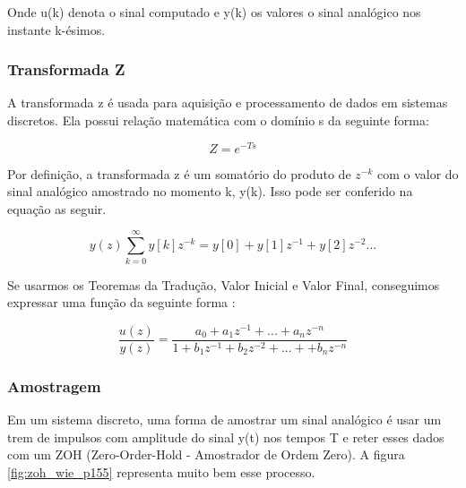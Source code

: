Onde u(k) denota o sinal computado e y(k) os valores o sinal analógico nos instante k-ésimos.



\subsubsection{Transformada Z}

A transformada z é usada para aquisição e processamento de dados em sistemas discretos. Ela possui relação matemática com o domínio s da seguinte forma:

\begin{equation}
Z = e^{-Ts}
\end{equation}

Por definição, a transformada z é um somatório do produto de $z^{-k}$ com o valor do sinal analógico amostrado no momento k, y(k). Isso pode ser conferido na equação as seguir.

\begin{equation}
  y(z) \sum_{k=0}^{\infty}{y[k]z^{-k}} = y[0] + y[1]z^{-1}+y[2]z^{-2}...
 \end{equation} 

 Se usarmos os Teoremas da Tradução, Valor Inicial e Valor Final, conseguimos expressar uma função da seguinte forma \cite{BongWie2001}:

\begin{equation}
  \frac{u(z)}{y(z)} = \frac{a_0 + a_1z^{-1}+...+a_nz^{-n}}{1+b_1z^{-1}+b_2z^{-2}+...++b_nz^{-n}}
\end{equation}



\subsubsection{Amostragem}

Em um sistema discreto, uma forma de amostrar um sinal analógico é usar um trem de impulsos com amplitude do sinal y(t) nos tempos T e reter esses dados com um ZOH (Zero-Order-Hold - Amostrador de Ordem Zero). A figura \ref{fig:zoh_wie_p155} representa muito bem esse processo.

